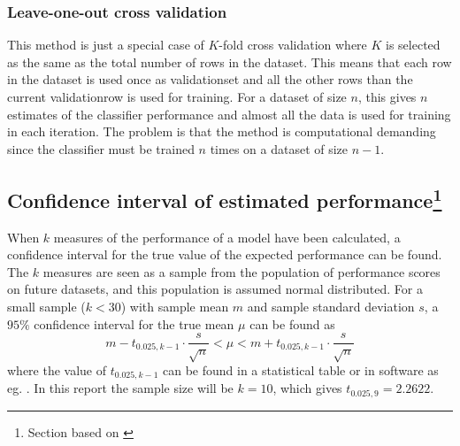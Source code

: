\subsubsection{Leave-one-out cross validation}
This method is just a special case of $K$-fold cross validation where $K$ is selected as the same as the total number of rows in the dataset. This means that each row in the dataset is used once as validationset and all the other rows than the current validationrow is used for training. For a dataset of size $n$, this gives $n$ estimates of the classifier performance and almost all the data is used for training in each iteration. The problem is that the method is computational demanding since the classifier must be trained $n$ times on a dataset of size $n-1$.


\subsection[Confidence interval of estimated performance]{Confidence interval of estimated performance\protect\footnote{Section based on \citet[p.232-233]{johnson05}}}\label{sec:statistics-on-performance}
When $k$ measures of the performance of a model have been calculated, a confidence interval for the true value of the expected performance can be found. The $k$ measures are seen as a sample from the population of performance scores on future datasets, and this population is assumed normal distributed. For a small sample ($k<30$) with sample mean $m$ and sample standard deviation $s$, a $95\%$ confidence interval for the true mean $\mu$ can be found as
\[
    m-t_{0.025,k-1}\cdot\frac{s}{\sqrt{n}} < \mu < m+t_{0.025,k-1}\cdot\frac{s}{\sqrt{n}}
\]
where the value of $t_{0.025,k-1}$ can be found in a statistical table or in software as eg. . In this report the sample size will be $k=10$, which gives $t_{0.025,9}=2.2622$.


